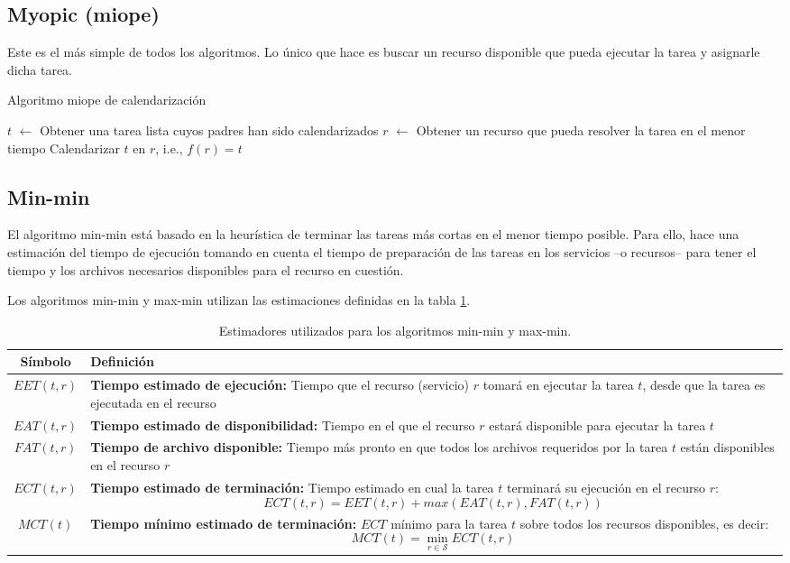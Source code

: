 \subsection{Myopic (miope)}
Este es el más simple de todos los algoritmos. Lo único que hace es buscar un recurso disponible que pueda ejecutar la tarea y asignarle dicha tarea.

\begin{algorithm}
\label{alg:myopic}
\caption{Algoritmo miope de calendarización}
 {
	$t$ $\leftarrow$ Obtener una tarea lista cuyos padres han sido calendarizados\;
	$r$ $\leftarrow$ Obtener un recurso que pueda resolver la tarea en el menor tiempo\;
	Calendarizar $t$ en $r$, i.e., $f(r) = t$\;
}
\end{algorithm}

\subsection{Min-min}
El algoritmo min-min está basado en la heurística de terminar las tareas más cortas en el menor tiempo posible. Para ello, hace una estimación del tiempo de ejecución tomando en cuenta el tiempo de preparación de las tareas en los servicios --o recursos-- para tener el tiempo y los archivos necesarios disponibles para el recurso en cuestión.

Los algoritmos min-min y max-min utilizan las estimaciones definidas en la tabla \ref{tbl:min-min-estimators}. %

\begin{centering}
\begin{table}
\label{tbl:min-min-estimators}
\caption{Estimadores utilizados para los algoritmos min-min y max-min.}
\begin{tabular}{|c|p{14cm}|}
\hline
Símbolo & Definición \\
\hline
$EET(t,r)$ & \textbf{Tiempo estimado de ejecución:} Tiempo que el recurso (servicio) $r$ tomará en ejecutar la tarea $t$, desde que la tarea es ejecutada en el recurso \\
$EAT(t,r)$ & \textbf{Tiempo estimado de disponibilidad:} Tiempo en el que el recurso $r$ estará disponible para ejecutar la tarea $t$ \\
$FAT(t,r)$ & \textbf{Tiempo de archivo disponible:} Tiempo más pronto en que todos los archivos requeridos por la tarea $t$ están disponibles en el recurso $r$ \\
$ECT(t,r)$ & \textbf{Tiempo estimado de terminación:} Tiempo estimado en cual la tarea $t$ terminará su ejecución en el recurso $r$: 
             \[ ECT(t,r) = EET(t,r) + max(EAT(t,r), FAT(t,r)) \]\\
$MCT(t)$ & \textbf{Tiempo mínimo estimado de terminación: } $ECT$ mínimo para la tarea $t$ sobre todos los recursos disponibles, es decir: 
           \[ MCT(t) = \min_{r \in \mathcal{S}} ECT(t,r) \]\\
\hline
\end{tabular}
\end{table}
\end{centering}

